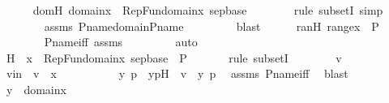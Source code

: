 \begin{isabellebody}
\isanewline
\ \ \ \ \isamarkupfalse%
\ domH{\isacharcolon}{\kern0pt}\ {\isachardoublequoteopen}domain{\isacharparenleft}{\kern0pt}x{\isacharparenright}{\kern0pt}\ {\isasymsubseteq}\ {\isasymUnion}RepFun{\isacharparenleft}{\kern0pt}domain{\isacharparenleft}{\kern0pt}x{\isacharparenright}{\kern0pt}{\isacharcomma}{\kern0pt}\ sep{\isacharunderscore}{\kern0pt}base{\isacharparenright}{\kern0pt}{\isachardoublequoteclose}\ \isanewline
\ \ \ \ \ \ \isamarkupfalse%
{\isacharparenleft}{\kern0pt}rule\ subsetI{\isacharcomma}{\kern0pt}\ simp{\isacharparenright}{\kern0pt}\isanewline
\ \ \ \ \ \ \isamarkupfalse%
\ assms\ P{\isacharunderscore}{\kern0pt}name{\isacharunderscore}{\kern0pt}domain{\isacharunderscore}{\kern0pt}P{\isacharunderscore}{\kern0pt}name\ \isanewline
\ \ \ \ \ \ \isamarkupfalse%
\ blast\isanewline
\isanewline
\ \ \ \ \isamarkupfalse%
\ ranH{\isacharcolon}{\kern0pt}\ {\isachardoublequoteopen}range{\isacharparenleft}{\kern0pt}x{\isacharparenright}{\kern0pt}\ {\isasymsubseteq}\ P{\isachardoublequoteclose}\ \isanewline
\ \ \ \ \ \ \isamarkupfalse%
\ P{\isacharunderscore}{\kern0pt}name{\isacharunderscore}{\kern0pt}iff\ assms\ \isanewline
\ \ \ \ \ \ \isamarkupfalse%
\ auto\isanewline
\isanewline
\ \ \ \ \isamarkupfalse%
\ H\ {\isacharcolon}{\kern0pt}\ {\isachardoublequoteopen}x\ {\isasymsubseteq}\ {\isasymUnion}RepFun{\isacharparenleft}{\kern0pt}domain{\isacharparenleft}{\kern0pt}x{\isacharparenright}{\kern0pt}{\isacharcomma}{\kern0pt}\ sep{\isacharunderscore}{\kern0pt}base{\isacharparenright}{\kern0pt}\ {\isasymtimes}\ P{\isachardoublequoteclose}\ \isanewline
\ \ \ \ \isamarkupfalse%
\ {\isacharparenleft}{\kern0pt}rule\ subsetI{\isacharparenright}{\kern0pt}\isanewline
\ \ \ \ \ \ \isamarkupfalse%
\ v\ \isamarkupfalse%
\ vin\ {\isacharcolon}{\kern0pt}\ {\isachardoublequoteopen}v\ {\isasymin}\ x{\isachardoublequoteclose}\ \isanewline
\ \ \ \ \ \ \isamarkupfalse%
\ \isamarkupfalse%
\ y\ p\ \ ypH\ {\isacharcolon}{\kern0pt}\ {\isachardoublequoteopen}v\ {\isacharequal}{\kern0pt}\ {\isacharless}{\kern0pt}y{\isacharcomma}{\kern0pt}\ p{\isachargreater}{\kern0pt}{\isachardoublequoteclose}\ \isamarkupfalse%
\ assms\ P{\isacharunderscore}{\kern0pt}name{\isacharunderscore}{\kern0pt}iff\ \isamarkupfalse%
\ blast\isanewline
\ \ \ \ \ \ \isamarkupfalse%
\ {\isachardoublequoteopen}y\ {\isasymin}\ domain{\isacharparenleft}{\kern0pt}x{\isacharparenright}{\kern0pt}{\isachardoublequoteclose}\ \isamarkupfalse%

\end{isabellebody}
